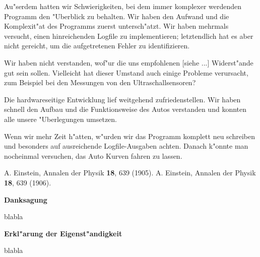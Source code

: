 \documentclass[a4paper,12pt]{article}
\begin{document}
Au"serdem hatten wir Schwierigkeiten, bei dem immer komplexer werdenden Programm den "Uberblick zu behalten.
Wir haben den Aufwand und die Komplexit"at des Programms zuerst untersch"atzt.
Wir haben mehrmals versucht, einen hinreichenden Logfile zu implementieren; letztendlich hat es aber nicht gereicht, um die aufgetretenen Fehler zu identifizieren.

Wir haben nicht verstanden, wof"ur die uns empfohlenen [siehe ...] Widerst"ande gut sein sollen.
Vielleicht hat dieser Umstand auch einige Probleme verursacht, zum Beispiel bei den Messungen von den Ultraschallsensoren?

Die hardwareseitige Entwicklung lief weitgehend zufriedenstellen.
Wir haben schnell den Aufbau und die Funktionsweise des Autos verstanden und konnten alle unsere "Uberlegungen umsetzen.

Wenn wir mehr Zeit h"atten, w"urden wir das Programm komplett neu schreiben und besonders auf ausreichende Logfile-Ausgaben achten.
Danach k"onnte man nocheinmal versuchen, das Auto Kurven fahren zu lassen.

\bigskip


\begin{thebibliography}{99}
	\itemsep-2pt \small
	 A. Einstein, Annalen der Physik {\bf 18}, 639 (1905).
	 A. Einstein, Annalen der Physik {\bf 18}, 639 (1906).
\end{thebibliography}

\newpage


{\large\bf Danksagung}

\medskip

blabla

\bigskip


{\large\bf Erkl"arung der Eigenst"andigkeit}

\medskip

blabla
\end{document}
